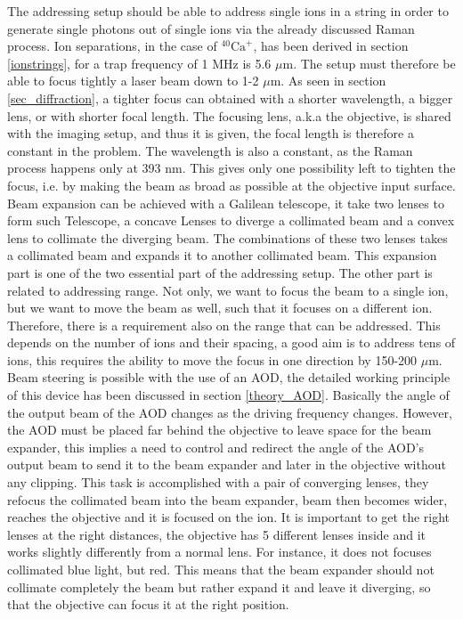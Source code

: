 The addressing setup should be able to address single ions in a string in order to generate single photons out of single ions via the already discussed Raman process. Ion separations, in the case of $^{40}\text{Ca}^+$, has been derived in section \ref{ionstrings}, for a trap frequency of 1 MHz is 5.6 $\mu$m. The setup must therefore be able to focus tightly a laser beam down to 1-2 $\mu$m. As seen in section \ref{sec_diffraction}, a tighter focus can obtained with a shorter wavelength, a bigger lens, or with shorter focal length. The focusing lens, a.k.a the objective, is shared with the imaging setup, and thus it is given, the focal length is therefore a constant in the problem. The wavelength is also a constant, as the Raman process happens only at 393 nm. This gives only one possibility left to tighten the focus, i.e. by making the beam as broad as possible at the objective input surface. Beam expansion can be achieved with a Galilean telescope, it take two lenses to form such Telescope, a concave Lenses to diverge a collimated beam and a convex lens to collimate the diverging beam. The combinations of these two lenses takes a collimated beam and expands it to another collimated beam. This expansion part is one of the two essential part of the addressing setup. The other part is related to addressing range. Not only, we want to focus the beam to a single ion, but we want to move the beam as well, such that it focuses on a different ion. Therefore, there is a requirement also on the range that can be addressed. This depends on the number of ions and their spacing, a good aim is to address tens of ions, this requires the ability to move the focus in one direction by 150-200 $\mu$m. Beam steering is possible with the use of an AOD, the detailed working principle of this device has been discussed in section \ref{theory_AOD}. Basically the angle of the output beam of the AOD changes as the driving frequency changes. However, the AOD must be placed far behind the objective to leave space for the beam expander, this implies a need to control and redirect the angle of the AOD's output beam to send it to the beam expander and later in the objective without any clipping. This task is accomplished with a pair of converging lenses, they refocus the collimated beam into the beam expander, beam then becomes wider, reaches the objective and it is focused on the ion. It is important to get the right lenses at the right distances, the objective has 5 different lenses inside and it works slightly differently from a normal lens. For instance, it does not focuses collimated blue light, but red. This means that the beam expander should not collimate completely the beam but rather expand it and leave it diverging, so that the objective can focus it at the right position.
